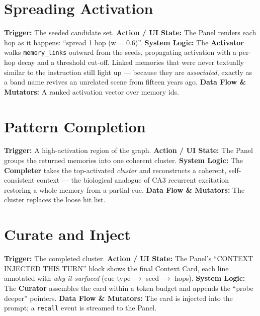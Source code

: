 \section{Spreading Activation}
\textbf{Trigger:} The seeded candidate set.
\textbf{Action / UI State:} The Panel renders each hop as it happens: ``spread 1 hop (w = 0.6)''.
\textbf{System Logic:} The \textbf{Activator} walks \texttt{memory\_links} outward from the seeds,
propagating activation with a per-hop decay and a threshold cut-off. Linked memories that were never
textually similar to the instruction still light up --- because they are \emph{associated}, exactly as
a band name revives an unrelated scene from fifteen years ago.
\textbf{Data Flow \& Mutators:} A ranked activation vector over memory ids.

\section{Pattern Completion}
\textbf{Trigger:} A high-activation region of the graph.
\textbf{Action / UI State:} The Panel groups the returned memories into one coherent cluster.
\textbf{System Logic:} The \textbf{Completer} takes the top-activated \emph{cluster} and reconstructs a
coherent, self-consistent context --- the biological analogue of CA3 recurrent excitation restoring a
whole memory from a partial cue.
\textbf{Data Flow \& Mutators:} The cluster replaces the loose hit list.

\section{Curate and Inject}
\textbf{Trigger:} The completed cluster.
\textbf{Action / UI State:} The Panel's ``CONTEXT INJECTED THIS TURN'' block shows the final Context
Card, each line annotated with \emph{why it surfaced} (cue type $\rightarrow$ seed $\rightarrow$ hops).
\textbf{System Logic:} The \textbf{Curator} assembles the card within a token budget and appends the
``probe deeper'' pointers.
\textbf{Data Flow \& Mutators:} The card is injected into the prompt; a \texttt{recall} event is
streamed to the Panel.

